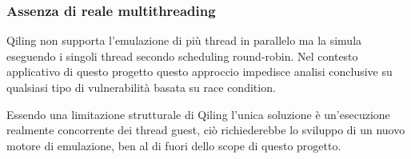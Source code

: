 \documentclass[11pt,a4paper]{article}
\begin{document}
\subsubsection{Assenza di reale multithreading} 
    Qiling non supporta l'emulazione di più thread in parallelo ma la simula eseguendo i singoli thread secondo scheduling round-robin. Nel contesto applicativo di questo progetto questo approccio impedisce analisi conclusive su qualsiasi tipo di vulnerabilità basata su race condition.

     Essendo una limitazione strutturale di Qiling l'unica soluzione è un'esecuzione realmente concorrente dei thread guest, ciò richiederebbe lo sviluppo di un nuovo motore di emulazione, ben al di fuori dello scope di questo progetto.
\end{document}
